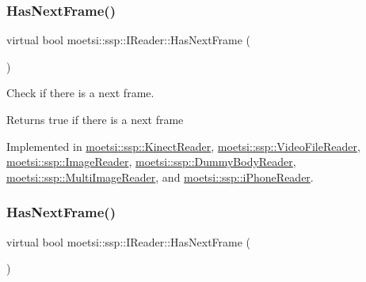 \mbox{\label{classmoetsi_1_1ssp_1_1IReader_af9186ba41e136dc4ec3242b5dd55fa04}} 
\subsubsection{\texorpdfstring{Has\+Next\+Frame()}{HasNextFrame()}\hspace{0.1cm}{\footnotesize\ttfamily [1/2]}}
{\footnotesize\ttfamily virtual bool moetsi\+::ssp\+::\+I\+Reader\+::\+Has\+Next\+Frame (\begin{DoxyParamCaption}{ }\end{DoxyParamCaption})\hspace{0.3cm}{\ttfamily [pure virtual]}}



Check if there is a next frame. 

\begin{DoxyReturn}{Returns}
true if there is a next frame 
\end{DoxyReturn}


Implemented in \hyperlink{classmoetsi_1_1ssp_1_1KinectReader_a08934b6eff437142e482bb21780ca171}{moetsi\+::ssp\+::\+Kinect\+Reader}, \hyperlink{classmoetsi_1_1ssp_1_1VideoFileReader_ab5733b56b6d6dd7596eac9d914481c7e}{moetsi\+::ssp\+::\+Video\+File\+Reader}, \hyperlink{classmoetsi_1_1ssp_1_1ImageReader_ad8e87720ca0ec97de501f1070119b28d}{moetsi\+::ssp\+::\+Image\+Reader}, \hyperlink{classmoetsi_1_1ssp_1_1DummyBodyReader_ab91b3c2ccdba21bae040340c34361595}{moetsi\+::ssp\+::\+Dummy\+Body\+Reader}, \hyperlink{classmoetsi_1_1ssp_1_1MultiImageReader_a04240c98d28d8949fca4ecdcb04f04f5}{moetsi\+::ssp\+::\+Multi\+Image\+Reader}, and \hyperlink{classmoetsi_1_1ssp_1_1iPhoneReader_a35ca55a03a9fb7b559f9381b11f53bfe}{moetsi\+::ssp\+::i\+Phone\+Reader}.

\mbox{\label{classmoetsi_1_1ssp_1_1IReader_af9186ba41e136dc4ec3242b5dd55fa04}} 
\subsubsection{\texorpdfstring{Has\+Next\+Frame()}{HasNextFrame()}\hspace{0.1cm}{\footnotesize\ttfamily [2/2]}}
{\footnotesize\ttfamily virtual bool moetsi\+::ssp\+::\+I\+Reader\+::\+Has\+Next\+Frame (\begin{DoxyParamCaption}{ }\end{DoxyParamCaption})\hspace{0.3cm}{\ttfamily [pure virtual]}}



